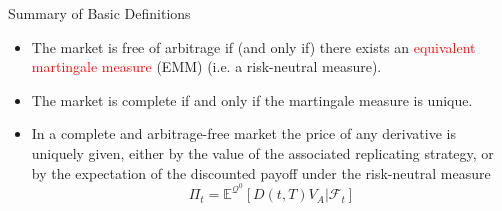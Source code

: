 \documentclass{beamer}
\begin{document}
\begin{frame}{Summary of Basic Definitions}
	\begin{itemize}
		\item The market is free of arbitrage if (and only if) there exists an \textcolor{red}{equivalent martingale measure} (EMM) (i.e. a risk-neutral measure).
		\item The market is complete if and only if the martingale measure is unique.
		\item In a complete and arbitrage-free market the price of any derivative is uniquely given, either by the value of the associated replicating strategy, or by the expectation of the discounted payoff under the risk-neutral measure
		\begin{equation}
			\Pi_t = \mathbb{E}^{\mathcal{Q}^0}[D(t,T)V_A|\mathcal{F}_t]
			\label{eq:risk_neutral_pricing}
		\end{equation}
	\end{itemize}
\end{frame}
\end{document}
